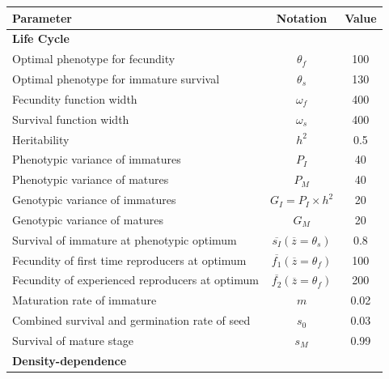 \documentclass[a4paper, 12pt]{article}
\begin{document}
\renewcommand{\arraystretch}{1.5}










%





\begin{table}
\begin{center}
	\begin{tabular}{l c c}
		\hline \hline
		Parameter & Notation & Value \\
		\hline
		\multicolumn{3}{l}{\textbf{Life Cycle}} \\
		Optimal phenotype for fecundity & $\theta_{f}$ & 100 \\
		Optimal phenotype for immature survival & $\theta_{s}$ & 130 \\
		Fecundity function width & $\omega_{f}$ & 400 \\
		Survival function width & $\omega_{s}$ & 400 \\
		Heritability & $h^2$ & 0.5 \\
		Phenotypic variance of immatures & $P_{I}$ & 40 \\
		Phenotypic variance of matures & $P_{M}$ & 40 \\
		Genotypic variance of immatures & $G_{I} = P_{I} \times h^2$ & 20 \\
		Genotypic variance of matures & $G_{M}$ & 20 \\
		Survival of immature at phenotypic optimum & $\overline{s_{I}}(\overline{z} = \theta_{s})$ & 0.8 \\
		Fecundity of first time reproducers at optimum & $\overline{f_{1}}(\overline{z} = \theta_{f})$ & 100 \\
		Fecundity of experienced reproducers at optimum & $\overline{f_{2}}(\overline{z} = \theta_{f})$ & 200 \\
		Maturation rate of immature & $m$ & 0.02 \\
		Combined survival and germination rate of seed & $s_{0}$ & 0.03 \\
		Survival of mature stage & $s_{M}$ & 0.99 \\
		\multicolumn{3}{l}{\textbf{Density-dependence}} \\

\end{tabular}
\end{center}
\end{table}
\end{document}
